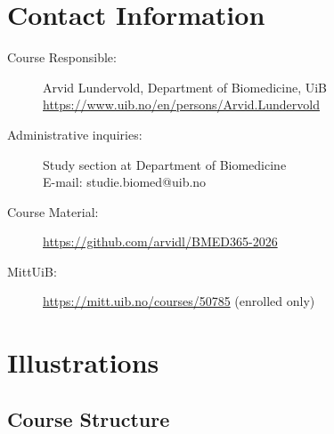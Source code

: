 \documentclass[11pt,a4paper]{article}
\begin{document}
\section{Contact Information}

\begin{description}
    \item[Course Responsible:] Arvid Lundervold, Department of Biomedicine, UiB\\
    \url{https://www.uib.no/en/persons/Arvid.Lundervold}
    
    \item[Administrative inquiries:] Study section at Department of Biomedicine\\
    E-mail: studie.biomed@uib.no
    
    \item[Course Material:] \url{https://github.com/arvidl/BMED365-2026}
    
    \item[MittUiB:] \url{https://mitt.uib.no/courses/50785} (enrolled only)
\end{description}

\newpage



\appendix
\section{Illustrations}

\subsection{Course Structure}
\end{document}
